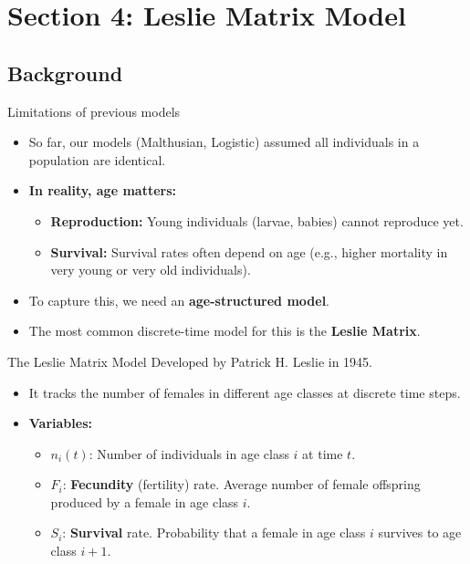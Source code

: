 \section{Section 4: Leslie Matrix Model}
\subsection{Background}

\begin{frame}{Limitations of previous models}
\begin{itemize}
    \item So far, our models (Malthusian, Logistic) assumed all individuals in a population are identical.
    \item \textbf{In reality, age matters:}
    \begin{itemize}
        \item \textbf{Reproduction:} Young individuals (larvae, babies) cannot reproduce yet.
        \item \textbf{Survival:} Survival rates often depend on age (e.g., higher mortality in very young or very old individuals).
    \end{itemize}
    \vspace{1em}
    \item To capture this, we need an \textbf{age-structured model}.
    \item The most common discrete-time model for this is the \textbf{Leslie Matrix}.
\end{itemize}
\end{frame}

\begin{frame}{The Leslie Matrix Model}
\small
Developed by Patrick H. Leslie in 1945.
\vspace{1em}
\begin{itemize}
    \item It tracks the number of females in different age classes at discrete time steps.
    \item \textbf{Variables:}
    \begin{itemize}
        \item $n_i(t)$: Number of individuals in age class $i$ at time $t$.
        \item $F_i$: \textbf{Fecundity} (fertility) rate. Average number of female offspring produced by a female in age class $i$.
        \item $S_i$: \textbf{Survival} rate. Probability that a female in age class $i$ survives to age class $i+1$.
    \end{itemize}
\end{itemize}
\end{frame}

